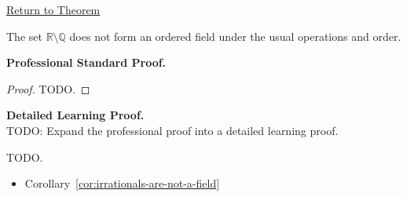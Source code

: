 \newpage
{}
\label{prf:irrationals-are-not-an-ordered-field}

\begin{remark*}[Return]
\hyperref[cor:irrationals-are-not-an-ordered-field]{Return to Theorem}
\end{remark*}

\begin{theorem*}
The set $\mathbb{R}\setminus\mathbb{Q}$ does not form an ordered field under
the usual operations and order.
\end{theorem*}

\textbf{Professional Standard Proof.}~\\
\begin{proof}
TODO.
\end{proof}

\textbf{Detailed Learning Proof.}~\\
TODO: Expand the professional proof into a detailed learning proof.


\begin{remark*}
TODO.
\end{remark*}

\begin{dependencies}
\begin{itemize}
  \item Corollary~\ref*{cor:irrationals-are-not-a-field}
\end{itemize}
\end{dependencies}

